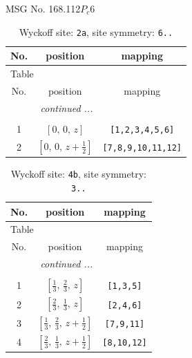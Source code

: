 \documentclass[fleqn,8pt]{jsarticle}
\begin{document}
\setcounter{MaxMatrixCols}{32}

\renewcommand{\tablename}{Table~}
\renewcommand{\figurename}{Figure~}
\begin{center}
\LARGE
MSG No. 168.112\quad$P_{c}6$
\end{center}
\renewcommand{\arraystretch}{1.2}
\begin{longtable}{ccc}
\caption{Wyckoff site: {\tt 2a}, site symmetry: {\tt 6..}}
 \\
 \hline \hline
No. & position & mapping \\ \hline \endfirsthead

\multicolumn{2}{l}{\tablename\ \thetable{}} \\
 \hline \hline
No. & position & mapping \\ \hline \endhead

 \hline \hline
\multicolumn{2}{r}{\footnotesize\it continued ...} \\ \endfoot

 \hline \hline
\multicolumn{2}{r}{} \\ \endlastfoot

1 & $\left[ 0,\, 0,\, z \right]$ & {\tt [1,2,3,4,5,6]} \\ \hline
2 & $\left[ 0,\, 0,\, z + \frac{1}{2} \right]$ & {\tt [7,8,9,10,11,12]} \\
\end{longtable}
\renewcommand{\arraystretch}{1.2}
\begin{longtable}{ccc}
\caption{Wyckoff site: {\tt 4b}, site symmetry: {\tt 3..}}
 \\
 \hline \hline
No. & position & mapping \\ \hline \endfirsthead

\multicolumn{2}{l}{\tablename\ \thetable{}} \\
 \hline \hline
No. & position & mapping \\ \hline \endhead

 \hline \hline
\multicolumn{2}{r}{\footnotesize\it continued ...} \\ \endfoot

 \hline \hline
\multicolumn{2}{r}{} \\ \endlastfoot

1 & $\left[ \frac{1}{3},\, \frac{2}{3},\, z \right]$ & {\tt [1,3,5]} \\ \hline
2 & $\left[ \frac{2}{3},\, \frac{1}{3},\, z \right]$ & {\tt [2,4,6]} \\ \hline
3 & $\left[ \frac{1}{3},\, \frac{2}{3},\, z + \frac{1}{2} \right]$ & {\tt [7,9,11]} \\ \hline
4 & $\left[ \frac{2}{3},\, \frac{1}{3},\, z + \frac{1}{2} \right]$ & {\tt [8,10,12]} \\
\end{longtable}
\end{document}

